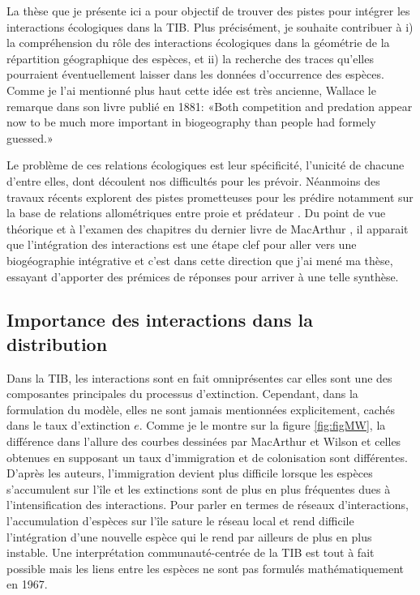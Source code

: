 La thèse que je présente ici a pour objectif de trouver des pistes pour
intégrer les interactions écologiques dans la TIB. Plus précisément, je
souhaite contribuer à i) la compréhension du rôle des interactions
écologiques dans la géométrie de la répartition géographique des
espèces, et ii) la recherche des traces qu'elles pourraient
éventuellement laisser dans les données d'occurrence des espèces. Comme
je l'ai mentionné plus haut cette idée est très ancienne, Wallace le
remarque dans son livre publié en 1881: «Both competition and predation
appear now to be much more important in biogeography than people had
formely guessed.»

Le problème de ces relations écologiques est leur spécificité, l'unicité
de chacune d'entre elles, dont découlent nos difficultés pour les
prévoir. Néanmoins des travaux récents explorent des pistes prometteuses
pour les prédire notamment sur la base de relations allométriques entre
proie et prédateur \citep{Gravel2013}. Du point de vue théorique et à
l'examen des chapitres du dernier livre de MacArthur
\citep{macarthur1972geographical}, il apparait que l'intégration des
interactions est une étape clef pour aller vers une biogéographie
intégrative et c'est dans cette direction que j'ai mené ma thèse,
essayant d'apporter des prémices de réponses pour arriver à une telle
synthèse.

\subsection*{Importance des interactions dans la
distribution}\label{importance-des-interactions-dans-la-distribution}

Dans la TIB, les interactions sont en fait omniprésentes car elles sont
une des composantes principales du processus d'extinction. Cependant,
dans la formulation du modèle, elles ne sont jamais mentionnées
explicitement, cachés dans le taux d'extinction \(e\). Comme je le
montre sur la figure \ref{fig:figMW}, la différence dans l'allure des
courbes dessinées par MacArthur et Wilson et celles obtenues en
supposant un taux d'immigration et de colonisation sont différentes.
D'après les auteurs, l'immigration devient plus difficile lorsque les
espèces s'accumulent sur l'île et les extinctions sont de plus en plus
fréquentes dues à l'intensification des interactions. Pour parler en
termes de réseaux d'interactions, l'accumulation d'espèces sur l'île
sature le réseau local et rend difficile l'intégration d'une nouvelle
espèce qui le rend par ailleurs de plus en plus instable. Une
interprétation communauté-centrée de la TIB est tout à fait possible
mais les liens entre les espèces ne sont pas formulés mathématiquement
en 1967.

